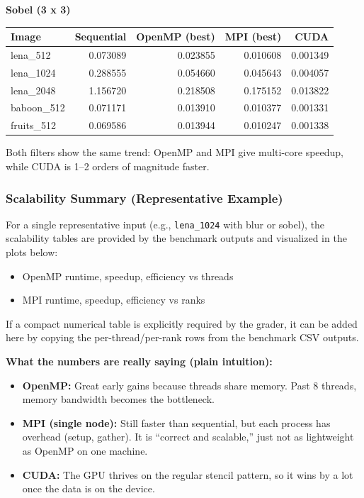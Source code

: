 \documentclass[
]{article}
\providecommand{\tightlist}{%
  \setlength{\itemsep}{0pt}\setlength{\parskip}{0pt}}
\begin{document}
\textbf{Sobel (3 x 3)}

\begin{longtable}[]{@{}lrrrr@{}}
\toprule\noalign{}
Image & Sequential & OpenMP (best) & MPI (best) & CUDA \\
\midrule\noalign{}
\endhead
\bottomrule\noalign{}
\endlastfoot
lena\_512 & 0.073089 & 0.023855 & 0.010608 & 0.001349 \\
lena\_1024 & 0.288555 & 0.054660 & 0.045643 & 0.004057 \\
lena\_2048 & 1.156720 & 0.218508 & 0.175152 & 0.013822 \\
baboon\_512 & 0.071171 & 0.013910 & 0.010377 & 0.001331 \\
fruits\_512 & 0.069586 & 0.013944 & 0.010247 & 0.001338 \\
\end{longtable}

Both filters show the same trend: OpenMP and MPI give multi-core
speedup, while CUDA is 1--2 orders of magnitude faster.

\subsubsection{Scalability Summary (Representative
Example)}\label{scalability-summary-representative-example}

For a single representative input (e.g., \texttt{lena\_1024} with blur
or sobel), the scalability tables are provided by the benchmark outputs
and visualized in the plots below:

\begin{itemize}
\tightlist
\item
  OpenMP runtime, speedup, efficiency vs threads
\item
  MPI runtime, speedup, efficiency vs ranks
\end{itemize}

If a compact numerical table is explicitly required by the grader, it
can be added here by copying the per-thread/per-rank rows from the
benchmark CSV outputs.

\textbf{What the numbers are really saying (plain intuition):}

\begin{itemize}
\tightlist
\item
  \textbf{OpenMP:} Great early gains because threads share memory. Past
  8 threads, memory bandwidth becomes the bottleneck.
\item
  \textbf{MPI (single node):} Still faster than sequential, but each
  process has overhead (setup, gather). It is ``correct and scalable,''
  just not as lightweight as OpenMP on one machine.
\item
  \textbf{CUDA:} The GPU thrives on the regular stencil pattern, so it
  wins by a lot once the data is on the device.
\end{itemize}
\end{document}
